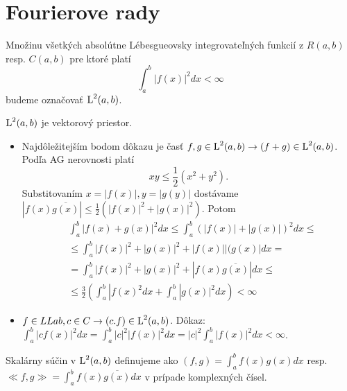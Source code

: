 \section{Fourierove rady}

\begin{definicia}

Množinu všetkých absolútne Lébesgueovsky integrovateľných funkcií z $R(a,b)$
resp. $C(a,b)$
pre ktoré platí
\begin{equation}
\int_a^b |f(x)|^2 dx < \infty
\end{equation}
budeme označovať $\mbox{L}^2(a,b)$.

\end{definicia}

\begin{lema}
$\mbox{L}^2(a,b)$ je vektorový priestor.
\end{lema}

\begin{dokaz}
\begin{itemize}
\item
Najdôležitejším bodom dôkazu je časť $f,g \in \mbox{L}^2(a,b) \rightarrow (f+g)\in \mbox{L}^2(a,b)$.
Podľa AG nerovnosti platí 
\begin{equation*}
    xy \le \frac{1}{2}(x^2 + y^2).
\end{equation*}
Substitovaním $x=|f(x)|,y=|g(y)|$ dostávame
$|f(x)\overline{g(x)}| \le \frac{1}{2} 
( |f(x)|^2 + |g(x)|^2) $.
 Potom
 \begin{eqnarray*}
    & \int_a^b |f(x)+g(x)|^2 dx  \le
    \int_a^b (|f(x)|+|g(x)|)^2 dx \le \\    
    & \le  \int_a^b |f(x)|^2 + |g(x)|^2 + |f(x)||(g(x)| dx = \\
    & = \int_a^b |f(x)|^2 + |g(x)|^2 + |f(x) \overline{g(x)}| dx \le \\
    & \le \frac{3}{2}( \int_a^b |f(x)^2 dx + \int_a^b |g(x)|^2 dx)
    < \infty
 \end{eqnarray*} 
\item
$f \in LLab, c\in C \rightarrow (c.f) \in \mbox{L}^2(a,b)$.
Dôkaz: $\int_a^b |cf(x)|^2 dx = \int_a^b |c|^2 |f(x)|^2 dx =
 |c|^2 \int_a^b |f(x)|^2 dx < \infty$.
\end{itemize}
\end{dokaz}

\begin{definicia}
 Skalárny súčin v $\mbox{L}^2(a,b)$ definujeme ako
  $(f,g) = \int_a^b f(x) g(x) dx$ resp. 
  $\ll f,g \gg = \int_a^b f(x) \overline{g(x)} dx$ v prípade
  komplexných čísel.
\end{definicia}

